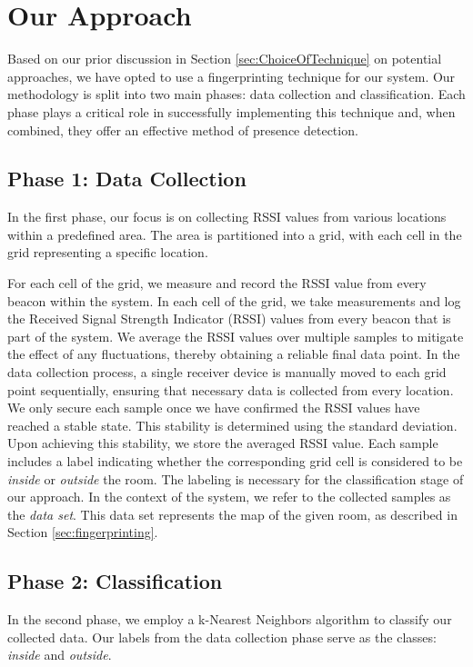 \section{Our Approach}\label{sec:our_approach}
Based on our prior discussion in Section \ref{sec:ChoiceOfTechnique} on potential approaches, we have opted to use a fingerprinting technique for our system.
Our methodology is split into two main phases: data collection and classification.
Each phase plays a critical role in successfully implementing this technique and, when combined, they offer an effective method of presence detection.

\subsection{Phase 1: Data Collection}\label{sec:phase1_data_collection}
In the first phase, our focus is on collecting RSSI values from various locations within a predefined area. The area is partitioned into a grid, with each cell in the grid representing a specific location. 

For each cell of the grid, we measure and record the RSSI value from every beacon within the system.
In each cell of the grid, we take measurements and log the Received Signal Strength Indicator (RSSI) values from every beacon that is part of the system. 
We average the RSSI values over multiple samples to mitigate the effect of any fluctuations, thereby obtaining a reliable final data point. 
In the data collection process, a single receiver device is manually moved to each grid point sequentially, ensuring that necessary data is collected from every location.
We only secure each sample once we have confirmed the RSSI values have reached a stable state. This stability is determined using the standard deviation.
Upon achieving this stability, we store the averaged RSSI value.
Each sample includes a label indicating whether the corresponding grid cell is considered to be \textit{inside} or \textit{outside} the room.
The labeling is necessary for the classification stage of our approach.
In the context of the system, we refer to the collected samples as the \textit{data set}.
This data set represents the map of the given room, as described in Section \ref{sec:fingerprinting}.


\subsection{Phase 2: Classification}\label{sec:phase2_classification}
In the second phase, we employ a k-Nearest Neighbors algorithm to classify our collected data. Our labels from the data collection phase serve as the classes: \textit{inside} and \textit{outside}.

